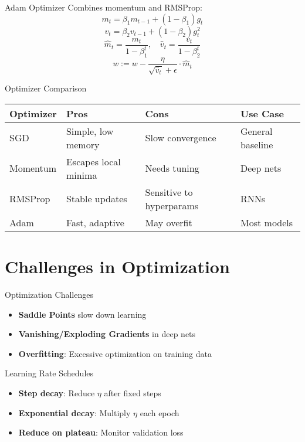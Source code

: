 \documentclass{beamer}
\begin{document}
\begin{frame}{Adam Optimizer}
Combines momentum and RMSProp:
\[
m_t = \beta_1 m_{t-1} + (1 - \beta_1) g_t
\]
\[
v_t = \beta_2 v_{t-1} + (1 - \beta_2) g_t^2
\]
\[
\hat{m}_t = \frac{m_t}{1 - \beta_1^t},\quad
\hat{v}_t = \frac{v_t}{1 - \beta_2^t}
\]
\[
w := w - \frac{\eta}{\sqrt{\hat{v}_t} + \epsilon} \cdot \hat{m}_t
\]
\end{frame}

\begin{frame}{Optimizer Comparison}
\footnotesize
\begin{tabular}{@{}llll@{}}
\toprule
\textbf{Optimizer} & \textbf{Pros} & \textbf{Cons} & \textbf{Use Case} \\
\midrule
SGD & Simple, low memory & Slow convergence & General baseline \\
Momentum & Escapes local minima & Needs tuning & Deep nets \\
RMSProp & Stable updates & Sensitive to hyperparams & RNNs \\
Adam & Fast, adaptive & May overfit & Most models \\
\bottomrule
\end{tabular}
\end{frame}

\section{Challenges in Optimization}
\begin{frame}{Optimization Challenges}
\begin{itemize}
    \item \textbf{Saddle Points} slow down learning
    \item \textbf{Vanishing/Exploding Gradients} in deep nets
    \item \textbf{Overfitting}: Excessive optimization on training data
\end{itemize}
\end{frame}

\begin{frame}{Learning Rate Schedules}
\begin{itemize}
    \item \textbf{Step decay}: Reduce \( \eta \) after fixed steps
    \item \textbf{Exponential decay}: Multiply \( \eta \) each epoch
    \item \textbf{Reduce on plateau}: Monitor validation loss
\end{itemize}
\end{frame}
\end{document}
